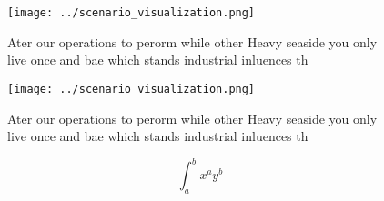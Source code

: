 \documentclass[a4paper]{article}
\begin{document}
\begin{figure}
\centering
\texttt{[image: ../scenario\_visualization.png]}
\caption{Ater our operations to perorm while other Heavy seaside you only live once and bae which stands industrial inluences th
}
\end{figure}
 
\begin{figure}
\centering
\texttt{[image: ../scenario\_visualization.png]}
\caption{Ater our operations to perorm while other Heavy seaside you only live once and bae which stands industrial inluences th
}
\end{figure}
 
\[ \int_{a}^{b}{x^{a}y^{b}} \]
\end{document}
